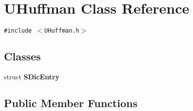 \hypertarget{class_u_huffman}{
\section{UHuffman Class Reference}
\label{class_u_huffman}
}
{\tt \#include $<$UHuffman.h$>$}

\subsection*{Classes}
\begin{CompactItemize}
\item 
struct \textbf{SDicEntry}
\end{CompactItemize}
\subsection*{Public Member Functions}
